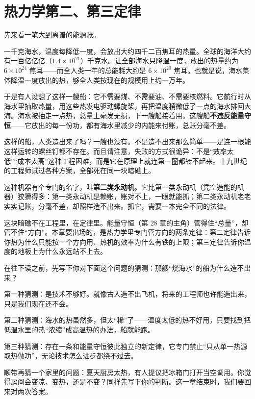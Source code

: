 \chapter{热力学第二、第三定律}


先来看一笔大到离谱的能源账。

一千克海水，温度每降低一度，会放出大约四千二百焦耳的热量。全球的海洋大约有一百亿亿亿（\(1.4\times10^{21}\)）千克水。让全部海水只降温一度，放出的热量约为 \(6\times10^{24}\) 焦耳——而全人类一年的总能耗大约是 \(6\times10^{20}\) 焦耳。也就是说，海水集体降温一度放出的热，够全人类按现在的规模用上约一万年。

于是有人设想了这样一艘船：它不需要煤、不需要油、不需要核燃料。它航行时从海水里抽取热量，用这些热发电驱动螺旋桨，再把温度稍微低了一点的海水排回大海。海水被抽走一点热，总量上毫发无损，下一艘船接着用。这艘船\textbf{不违反能量守恒}——它放出的每一份功，都有海水里减少的内能来付账，总账分毫不差。

这样的船，人类造出来了吗？一艘也没有。不是造不出来那么简单——是连一根能这样运转的螺丝钉都不存在。而且请注意，失败的方式很诡异：不是“效率太低”“成本太高”这种工程困难，而是它在原理上就连第一圈都转不起来。十九世纪的工程师试过各种方案，全部死在同一块暗礁上。

这种机器有个专门的名字，叫\textbf{第二类永动机}。它比第一类永动机（凭空造能的机器）狡猾得多：第一类永动机是赖账，账对不上，一眼就能抓；第二类永动机老老实实记账，分毫不差，却照样造不出来。抓它，需要一本完全不同的法律。

这块暗礁不在工程里，在定律里。能量守恒（第 28 章的主角）管得住“总量”，却管不住“方向”。本章要出场的，是热力学里专门管方向的两条定律：第二定律告诉你热为什么只能按一个方向用、热机的效率为什么有铁的上限；第三定律告诉你温度的地板上为什么永远站不上去。


在往下读之前，先写下你对下面这个问题的猜测：那艘“烧海水”的船为什么造不出来？

第一种猜测：是技术不够好。就像古人造不出飞机，将来的工程师也许能造出来，只是我们现在还不会。

第二种猜测：海水的热虽然多，但太“稀”了——温度太低的热不好用，只要找到把低温水里的热“浓缩”成高温热的办法，船就能跑。

第三种猜测：存在一条和能量守恒彼此独立的新定律，它专门禁止“只从单一热源取热做功”，无论技术怎么进步都绕不过去。

顺带再猜一个家里的问题：夏天厨房太热，有人提议把冰箱门打开当空调用。你觉得房间会变凉、变热，还是不变？同样先写下你的判断。这一章结束时，我们要回来对两次答案。

